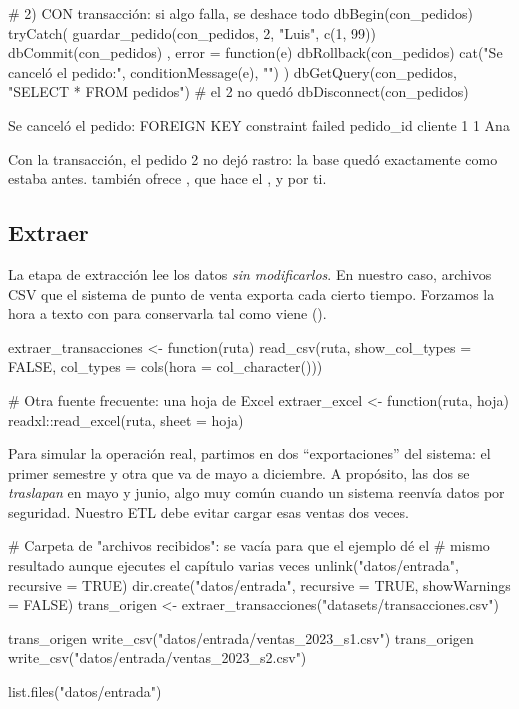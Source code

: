 \begin{rcode}
# 2) CON transacción: si algo falla, se deshace todo
dbBegin(con_pedidos)
tryCatch({
  guardar_pedido(con_pedidos, 2, "Luis", c(1, 99))
  dbCommit(con_pedidos)
}, error = function(e) {
  dbRollback(con_pedidos)
  cat("Se canceló el pedido:", conditionMessage(e), "\n")
})
dbGetQuery(con_pedidos, "SELECT * FROM pedidos")   # el 2 no quedó
dbDisconnect(con_pedidos)
\end{rcode}

\begin{rsalida}
Se canceló el pedido: FOREIGN KEY constraint failed 
  pedido_id cliente
1         1     Ana
\end{rsalida}

Con la transacción, el pedido 2 no dejó rastro: la base quedó exactamente
como estaba antes.  también ofrece
, que hace el
,  y  por ti.

\subsection{Extraer}

La etapa de extracción lee los datos \emph{sin modificarlos}. En nuestro
caso, archivos CSV que el sistema de punto de venta exporta cada cierto
tiempo. Forzamos la hora a texto con  para conservarla
tal como viene ().

\begin{rcode}
extraer_transacciones <- function(ruta) {
  read_csv(ruta, show_col_types = FALSE,
           col_types = cols(hora = col_character()))
}

# Otra fuente frecuente: una hoja de Excel
extraer_excel <- function(ruta, hoja) {
  readxl::read_excel(ruta, sheet = hoja)
}
\end{rcode}

Para simular la operación real, partimos  en dos
``exportaciones'' del sistema: el primer semestre y otra que va de mayo a
diciembre. A propósito, las dos se \emph{traslapan} en mayo y junio, algo
muy común cuando un sistema reenvía datos por seguridad. Nuestro ETL debe
evitar cargar esas ventas dos veces.

\begin{rcode}
# Carpeta de "archivos recibidos": se vacía para que el ejemplo dé el
# mismo resultado aunque ejecutes el capítulo varias veces
unlink("datos/entrada", recursive = TRUE)
dir.create("datos/entrada", recursive = TRUE, showWarnings = FALSE)
trans_origen <- extraer_transacciones("datasets/transacciones.csv")

trans_origen %
  write_csv("datos/entrada/ventas_2023_s1.csv")
trans_origen %
  write_csv("datos/entrada/ventas_2023_s2.csv")

list.files("datos/entrada")
\end{rcode}

